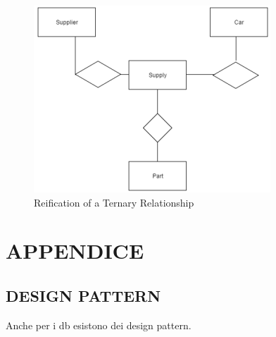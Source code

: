 \begin{center}
\begin{figure}[H]
\centering
\includegraphics[scale=1]{figures/reification.png}
\caption{Reification of a Ternary Relationship} 
\end{figure}
\end{center}


\section{APPENDICE}

\subsection{DESIGN PATTERN}

Anche per i db esistono dei design pattern.

